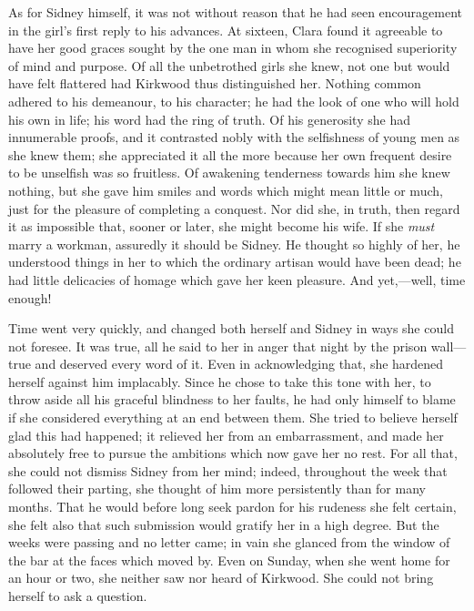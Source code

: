 As for Sidney himself, it was not without reason that he had seen
encouragement in the girl's first reply to his advances. At sixteen,
Clara found it agreeable to have her good graces sought by the one man
in whom she recognised superiority of mind and purpose. Of all the
unbetrothed girls she knew, not one but would have felt flattered had
Kirkwood thus distinguished her. Nothing common adhered to his
demeanour, to his character; he had the look of one who will hold his
own in life; his word had the ring of truth. Of his generosity she had
innumerable proofs, and it contrasted nobly with the selfishness of
young men as she knew them; she {}appreciated it all the more because
her own frequent desire to be unselfish was so fruitless. Of awakening
tenderness towards him she knew nothing, but she gave him smiles and
words which might mean little or much, just for the pleasure of
completing a conquest. Nor did she, in truth, then regard it as
impossible that, sooner or later, she might become his wife. If she
\emph{must} marry a workman, assuredly it should be Sidney. He thought
so highly of her, he understood things in her to which the ordinary
artisan would have been dead; he had little delicacies of homage which
gave her keen pleasure. And yet,---well, time enough!

Time went very quickly, and changed both herself and Sidney in ways she
could not foresee. It was true, all he said to her in anger that night
by the prison wall---true and deserved every word of it. Even in
acknowledging that, she hardened herself against him implacably. Since
he chose to take this tone with her, to throw aside all his graceful
blindness to her faults, he had only himself to {}blame if she
considered everything at an end between them. She tried to believe
herself glad this had happened; it relieved her from an embarrassment,
and made her absolutely free to pursue the ambitions which now gave her
no rest. For all that, she could not dismiss Sidney from her mind;
indeed, throughout the week that followed their parting, she thought of
him more persistently than for many months. That he would before long
seek pardon for his rudeness she felt certain, she felt also that such
submission would gratify her in a high degree. But the weeks were
passing and no letter came; in vain she glanced from the window of the
bar at the faces which moved by. Even on Sunday, when she went home for
an hour or two, she neither saw nor heard of Kirkwood. She could not
bring herself to ask a question.

